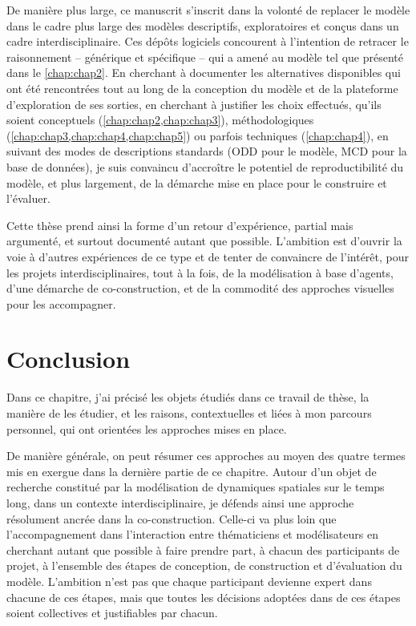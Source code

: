 De manière plus large, ce manuscrit s'inscrit dans la volonté de replacer le modèle \simfeodal{} dans le cadre plus large des modèles descriptifs, exploratoires et conçus dans un cadre interdisciplinaire.
Ces dépôts logiciels concourent à l'intention de retracer le raisonnement -- générique et spécifique -- qui a amené au modèle \simfeodal{} tel que présenté dans le \cref{chap:chap2}.
En cherchant à documenter les alternatives disponibles qui ont été rencontrées tout au long de la conception du modèle et de la plateforme d'exploration de ses sorties, en cherchant à justifier les choix effectués, qu'ils soient conceptuels (\cref{chap:chap2,chap:chap3}), méthodologiques (\cref{chap:chap3,chap:chap4,chap:chap5}) ou parfois techniques (\cref{chap:chap4}), en suivant des modes de descriptions standards (ODD pour le modèle, MCD pour la base de données), je suis convaincu d'accroître le potentiel de reproductibilité du modèle, et plus largement, de la démarche mise en place pour le construire et l'évaluer.

Cette thèse prend ainsi la forme d'un retour d'expérience, partial mais argumenté, et surtout documenté autant que possible.
L'ambition est d'ouvrir la voie à d'autres expériences de ce type et de tenter de convaincre de l'intérêt, pour les projets interdisciplinaires, tout à la fois, de la modélisation à base d'agents, d'une démarche de co-construction, et de la commodité des approches visuelles pour les accompagner.


\section*{Conclusion}

Dans ce chapitre, j'ai précisé les objets étudiés dans ce travail de thèse, la manière de les étudier, et les raisons, contextuelles et liées à mon parcours personnel, qui ont orientées les approches mises en place.

De manière générale, on peut résumer ces approches au moyen des quatre termes mis en exergue dans la dernière partie de ce chapitre.
Autour d'un objet de recherche constitué par la modélisation de dynamiques spatiales sur le temps long, dans un contexte interdisciplinaire, je défends ainsi une approche résolument ancrée dans la co-construction.
Celle-ci va plus loin que l'accompagnement dans l'interaction entre \og thématiciens\fg{} et \og modélisateurs\fg{} en cherchant autant que possible à faire prendre part, à chacun des participants de projet, à l'ensemble des étapes de conception, de construction et d'évaluation du modèle.
L'ambition n'est pas que chaque participant devienne expert dans chacune de ces étapes, mais que toutes les décisions adoptées dans de ces étapes soient collectives et justifiables par chacun.


